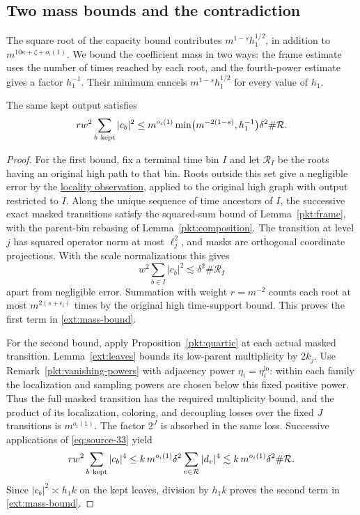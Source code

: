 \subsection{Two mass bounds and the contradiction}

The square root of the capacity bound contributes
\(m^{1-s}h_1^{1/2}\), in addition to
\(m^{10\kappa+\zeta+o_i(1)}\). We bound the coefficient mass in
two ways: the frame estimate uses the number of times reached by each
root, and the fourth-power estimate gives a factor \(h_1^{-1}\).
Their minimum cancels \(m^{1-s}h_1^{1/2}\) for every value of \(h_1\).

\begin{lemma}\label{ext:mass}
The same kept output satisfies
\begin{equation}\label{ext:mass-bound}
 r w^2\sum_{b\ {\rm kept}}|c_b|^2
 \leq m^{o_i(1)}
       \min\bigl(m^{-2(1-s)},h_1^{-1}\bigr)
       \delta^2\#\mathcal R .
\end{equation}
\end{lemma}

\begin{proof}
For the first bound, fix a terminal time bin \(I\) and let
\(\mathcal R_I\) be the roots having an original high path to
that bin. Roots outside this set give a negligible error by the
\hyperref[ext:diagram-locality]{locality observation}, applied to the
original high graph with output restricted to \(I\).
Along the unique sequence of time ancestors of \(I\), the
successive exact masked transitions satisfy the squared-sum
bound of Lemma~\ref{pkt:frame}, with the parent-bin rebasing
of Lemma~\ref{pkt:composition}. The transition at level \(j\)
has squared operator norm at most \(\ell_j^2\), and masks are
orthogonal coordinate projections. With the scale
normalizations this gives
\[
                    w^2\sum_{b\in I}|c_b|^2
                    \lesssim \delta^2\#\mathcal R_I
\]
apart from negligible error. Summation with weight \(r=m^{-2}\)
counts each root at most \(m^{2(s+\epsilon_i)}\) times by the
original high time-support bound. This proves the first term in
\eqref{ext:mass-bound}.

For the second bound, apply Proposition~\ref{pkt:quartic} at each
actual masked transition. Lemma~\ref{ext:leaves} bounds its
low-parent multiplicity by \(2k_j\). Use
Remark~\ref{pkt:vanishing-powers} with adjacency power
\(\eta_i=\eta_i^{\mathrm{lo}}\): within each family the localization
and sampling powers are chosen below this fixed positive power.
Thus the full masked transition has the required multiplicity bound,
and the product of its localization, coloring, and decoupling losses
over the fixed \(J\) transitions is \(m^{o_i(1)}\).
The factor \(2^J\) is absorbed in the same loss.
Successive applications of \eqref{eq:source-33} yield
\[
 r w^2\sum_{b\ {\rm kept}}|c_b|^4
 \leq k\,m^{o_i(1)}
          \delta^2\sum_{v\in\mathcal R}|d_v|^4
 \lesssim k\,m^{o_i(1)}\delta^2\#\mathcal R .
\]
Since \(|c_b|^2\asymp h_1k\) on the kept leaves, division by
\(h_1k\) proves the second term in \eqref{ext:mass-bound}.
\end{proof}

